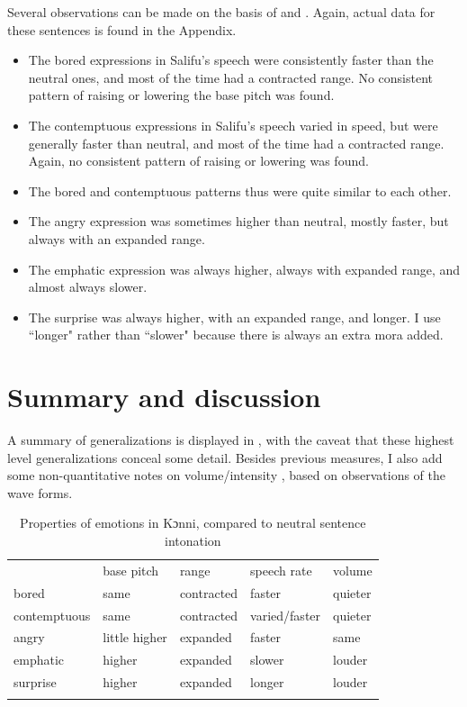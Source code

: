 \documentclass[output=paper]{langsci/langscibook}
\begin{document}
Several observations can be made on the basis of  and . Again, actual data for these sentences is found in the Appendix.

\begin{itemize}
\item The bored expressions in Salifu's speech were consistently faster than the neutral ones, and most of the time had a contracted range. No consistent pattern of raising or lowering the base pitch was found.
\item The contemptuous expressions in Salifu's speech varied in speed, but were generally faster than neutral, and most of the time had a contracted range. Again, no consistent pattern of raising or lowering was found.
\item The bored and contemptuous patterns thus were quite similar to each other.
\item The angry expression was sometimes higher than neutral, mostly faster, but always with an expanded range.
\item The emphatic expression was always higher, always with expanded range, and almost always slower.
\item The surprise was always higher, with an expanded range, and longer. I use ``longer" rather than ``slower" because there is always an extra mora added.
\end{itemize}


\section{Summary and discussion}

A summary of generalizations is displayed in , with the caveat that these highest level generalizations conceal some detail. Besides previous measures, I also add some non-quantitative notes on volume/intensity , based on observations of the wave forms. 


\begin{table}
\begin{tabular}{lllll} & base pitch & range & speech rate & volume\\
\lsptoprule
bored & same & contracted & faster & quieter\\
contemptuous & same & contracted & varied/faster & quieter\\
angry & little higher & expanded & faster & same\\
emphatic & higher & expanded & slower & louder\\
surprise & higher & expanded & longer & louder\\
\lspbottomrule
\end{tabular}

\caption{Properties of emotions in Kɔnni, compared to neutral sentence intonation}
\label{tab:5.cahill}

\end{table}
\end{document}
